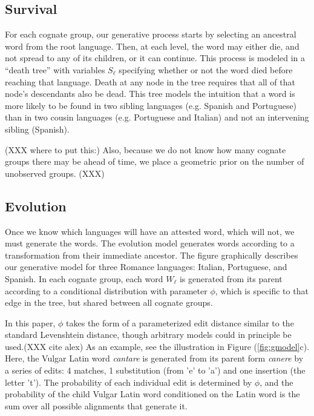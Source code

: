\documentclass[11pt,a4paper]{article}
\begin{document}
\subsection{Survival}

For each cognate group, our generative process starts by selecting
an ancestral word from the root language. Then, at each level, the
word may either die, and not spread to any of its children, or it
can continue. This process is modeled in a ``death tree'' with
variables $S_\ell$ specifying whether or not the word died before
reaching that language. Death at any node in the tree requires that
all of that node's descendants also be dead. This tree models the
intuition that a word is more likely to be found in two sibling
languages (e.g. Spanish and Portuguese) than in two cousin languages
(e.g. Portuguese and Italian) and not an intervening sibling
(Spanish). 

(XXX where to put this:) Also, because we do not know how many
cognate groups there may be ahead of time, we place a geometric
prior on the number of unobserved groups. (XXX)

\subsection{Evolution}

Once we know which languages will have an attested word, which will
not, we must generate the words. The evolution model generates
words according to a transformation from their immediate ancestor.
The figure graphically describes our generative model for three
Romance languages: Italian, Portuguese, and Spanish.  In each cognate
group, each word $W_\ell$ is generated from its parent according to a
conditional distribution with parameter $\phi$, which is specific
to that edge in the tree, but shared between all cognate
groups.

In this paper, $\phi$ takes the form of a parameterized edit distance
similar to the standard Levenshtein distance, though arbitrary
models could in principle be used.(XXX cite alex) As an example,
see the illustration in Figure (\ref{fig:gmodel}c). Here, the Vulgar
Latin word \textit{cantare} is generated from its parent form
\textit{canere} by a series of edits: 4 matches, 1 substitution
(from 'e' to 'a') and one insertion (the letter 't'). The probability
of each individual edit is determined by $\phi$, and the probability
of the child Vulgar Latin word conditioned on the Latin word is the
sum over all possible alignments that generate it.
\end{document}

